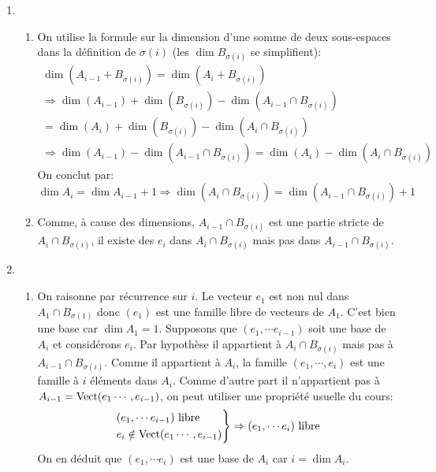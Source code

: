 \begin{enumerate}
\begin{enumerate}
\end{enumerate}

  \item
\begin{enumerate}
  \item On utilise la formule sur la dimension d'une somme de deux sous-espaces dans la définition de $\sigma(i)$ (les $\dim B_{\sigma(i)}$ se simplifient):
\begin{multline*}
  \dim(A_{i-1} + B_{\sigma(i)}) = \dim(A_{i} + B_{\sigma(i)}) \\
\Rightarrow \dim(A_{i-1}) + \dim(B_{\sigma(i)}) -\dim(A_{i-1}\cap B_{\sigma(i)}) \\
= \dim(A_{i}) + \dim(B_{\sigma(i)}) - \dim(A_i \cap B_{\sigma(i)}) \\
\Rightarrow \dim(A_{i-1}) - \dim(A_{i-1}\cap B_{\sigma(i)}) = \dim(A_{i}) - \dim(A_i \cap B_{\sigma(i)})
\end{multline*}
On conclut par:
\begin{displaymath}
\dim A_{i} = \dim A_{i-1}+1 \Rightarrow \dim(A_{i}\cap B_{\sigma(i)}) =  \dim(A_{i-1}\cap B_{\sigma(i)})+1 
\end{displaymath}

  \item Comme, à cause des dimensions, $A_{i-1}\cap B_{\sigma(i)}$ est une partie stricte de $A_{i}\cap B_{\sigma(i)}$, il existe des $e_i$ dans $A_{i}\cap B_{\sigma(i)}$ mais pas dans $A_{i-1}\cap B_{\sigma(i)}$.
\end{enumerate}

  \item 
\begin{enumerate}
  \item On raisonne par récurrence sur $i$. Le vecteur $e_1$ est non nul dans $A_1\cap B_{\sigma(1)}$ donc $(e_1)$ est une famille libre de vecteurs de $A_1$. C'est bien une base car $\dim A_1 = 1$.\newline
  Supposons que $(e_1,\cdots e_{i-1})$ soit une base de $A_i$ et considérons $e_i$. Par hypothèse il appartient à $A_{i}\cap B_{\sigma(i)}$ mais pas à $A_{i-1}\cap B_{\sigma(i)}$. Comme il appartient à $A_i$, la famille $(e_1,\cdots,e_i)$ est une famille à $i$ éléments dans $A_i$. Comme d'autre part il n'appartient pas à $A_{i-1}=\operatorname{Vect}(e_1\cdots,e_{i-1})$, on peut utiliser une propriété usuelle du cours:
\begin{displaymath}
  \left. 
  \begin{aligned}
    &(e_1,\cdots e_{i-1}) \text{ libre} \\ & e_i \notin \operatorname{Vect}(e_1\cdots,e_{i-1})
  \end{aligned}
\right\rbrace \Rightarrow (e_1,\cdots e_{i}) \text{ libre}
\end{displaymath}
On en déduit que $(e_1,\cdots e_{i})$ est une base de $A_i$ car $i=\dim A_i$.


\end{enumerate}
\end{enumerate}
